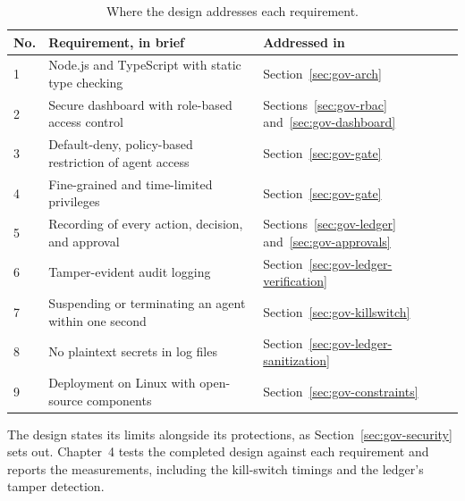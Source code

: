\begin{table}[htbp]
\centering
\caption{Where the design addresses each requirement.}
\label{tab:gov-requirement-map}
\small
\begin{tabularx}{\textwidth}{@{}p{}>{\raggedright\arraybackslash}X>{\raggedright\arraybackslash}p{}@{}}
\toprule
\textbf{No.} & \textbf{Requirement, in brief} & \textbf{Addressed in} \\
\midrule
1 & Node.js and TypeScript with static type checking &
Section~\ref{sec:gov-arch} \\
2 & Secure dashboard with role-based access control &
Sections~\ref{sec:gov-rbac} and~\ref{sec:gov-dashboard} \\
3 & Default-deny, policy-based restriction of agent access &
Section~\ref{sec:gov-gate} \\
4 & Fine-grained and time-limited privileges & Section~\ref{sec:gov-gate}
\\
5 & Recording of every action, decision, and approval &
Sections~\ref{sec:gov-ledger} and~\ref{sec:gov-approvals} \\
6 & Tamper-evident audit logging &
Section~\ref{sec:gov-ledger-verification} \\
7 & Suspending or terminating an agent within one second &
Section~\ref{sec:gov-killswitch} \\
8 & No plaintext secrets in log files &
Section~\ref{sec:gov-ledger-sanitization} \\
9 & Deployment on Linux with open-source components &
Section~\ref{sec:gov-constraints} \\
\bottomrule
\end{tabularx}
\end{table}

The design states its limits alongside its protections, as
Section~\ref{sec:gov-security} sets out. Chapter~4 tests the completed
design against each requirement and reports the measurements, including
the kill-switch timings and the ledger's tamper detection.
